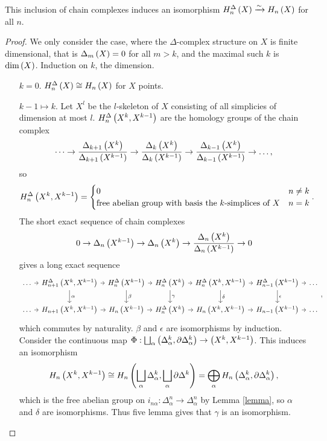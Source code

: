\begin{theorem}
This inclusion of chain complexes induces an isomorphism $ H_n^\Delta\left( X \right) \xrightarrow{\sim} H_n\left( X \right) $ for all $ n $.
\end{theorem}

\begin{proof}
We only consider the case, where the $ \Delta $-complex structure on $ X $ is finite dimensional, that is $ \Delta_m\left( X \right) = 0 $ for all $ m > k $, and the maximal such $ k $ is $ \dim\left( X \right) $. Induction on $ k $, the dimension.
\begin{itemize}[leftmargin=2cm]
\item[$ k = 0 $.] $ H_n^\Delta\left( X \right) \cong H_n\left( X \right) $ for $ X $ points.
\item[$ k - 1 \mapsto k $.] Let $ X^l $ be the $ l $-skeleton of $ X $ consisting of all simplicies of dimension at most $ l $. $ H_n^\Delta\left( X^k, X^{k - 1} \right) $ are the homology groups of the chain complex
$$ \dots \to \dfrac{\Delta_{k + 1}\left( X^k \right)}{\Delta_{k + 1}\left( X^{k - 1} \right)} \to \dfrac{\Delta_k\left( X^k \right)}{\Delta_k\left( X^{k - 1} \right)} \to \dfrac{\Delta_{k - 1}\left( X^k \right)}{\Delta_{k - 1}\left( X^{k - 1} \right)} \to \dots, $$
so
$$ H_n^\Delta\left( X^k, X^{k - 1} \right) =
\begin{cases}
0 & n \ne k \\
\text{free abelian group with basis the $ k $-simplices of} \ X & n = k
\end{cases}.
$$
The short exact sequence of chain complexes
$$ 0 \to \Delta_n\left( X^{k - 1} \right) \to \Delta_n\left( X^k \right) \to \dfrac{\Delta_n\left( X^k \right)}{\Delta_n\left( X^{k - 1} \right)} \to 0 $$
gives a long exact sequence
$$
\begin{tikzcd}[column sep=tiny]
\dots \arrow{r} & H_{n + 1}^\Delta\rb{X^k, X^{k - 1}} \arrow{r} \arrow{d}{\alpha} & H_n^\Delta\rb{X^{k - 1}} \arrow{r} \arrow{d}{\beta} & H_n^\Delta\rb{X^k} \arrow{r} \arrow{d}{\gamma} & H_n^\Delta\rb{X^k, X^{k - 1}} \arrow{r} \arrow{d}{\delta} & H_{n - 1}^\Delta\rb{X^{k - 1}} \arrow{d}{\epsilon} \arrow{r} & \dots \\
\dots \arrow{r} & H_{n + 1}\rb{X^k, X^{k - 1}} \arrow{r} & H_n\rb{X^{k - 1}} \arrow{r} & H_n^\Delta\rb{X^k} \arrow{r} & H_n\rb{X^k, X^{k - 1}} \arrow{r} & H_{n - 1}\rb{X^{k - 1}} \arrow{r} & \dots
\end{tikzcd},
$$
which commutes by naturality. $ \beta $ and $ \epsilon $ are isomorphisms by induction. Consider the continuous map $ \Phi : \bigsqcup_\alpha \left( \Delta_\alpha^k, \partial\Delta_\alpha^k \right) \to \left( X^k, X^{k - 1} \right) $. This induces an isomorphism
$$ H_n\left( X^k, X^{k - 1} \right) \cong H_n\left( \bigsqcup_\alpha \Delta_\alpha^k, \bigsqcup_\alpha \partial\Delta^k \right) = \bigoplus_\alpha H_n\left( \Delta_\alpha^k, \partial\Delta_\alpha^k \right), $$
which is the free abelian group on $ i_{n\alpha} : \Delta_\alpha^n \to \Delta_\alpha^n $ by Lemma \ref{lemma}, so $ \alpha $ and $ \delta $ are isomorphisms. Thus five lemma gives that $ \gamma $ is an isomorphism.
\end{itemize}
\end{proof}


